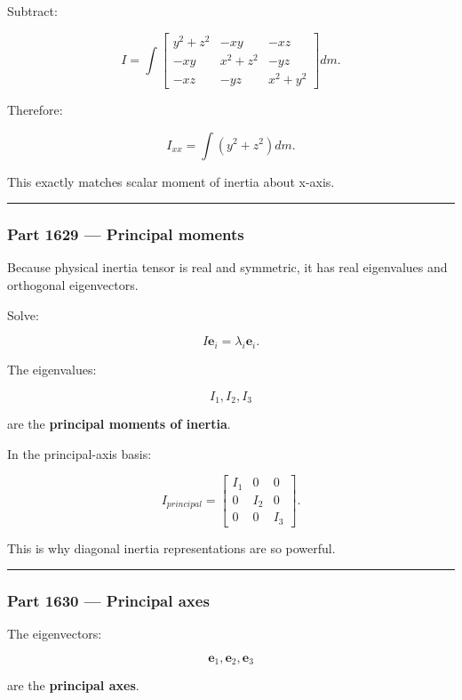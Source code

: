 Subtract:

\[
I=
\int
\begin{bmatrix}
y^2+z^2&-xy&-xz\\
-xy&x^2+z^2&-yz\\
-xz&-yz&x^2+y^2
\end{bmatrix}
dm.
\]

Therefore:

\[
I_{xx}
=
\int(y^2+z^2)dm.
\]

This exactly matches scalar moment of inertia about x-axis.

\begin{center}\rule{0.5\linewidth}{0.5pt}\end{center}

\subsubsection{Part 1629 --- Principal moments}\label{part-1629-principal-moments}

Because physical inertia tensor is real and symmetric, it has real eigenvalues and orthogonal eigenvectors.

Solve:

\[
I\mathbf{e}_i
=
\lambda_i\mathbf{e}_i.
\]

The eigenvalues:

\[
\boxed{
I_1,I_2,I_3
}
\]

are the \textbf{principal moments of inertia}.

In the principal-axis basis:

\[
I_{principal}
=
\begin{bmatrix}
I_1&0&0\\
0&I_2&0\\
0&0&I_3
\end{bmatrix}.
\]

This is why diagonal inertia representations are so powerful.

\begin{center}\rule{0.5\linewidth}{0.5pt}\end{center}

\subsubsection{Part 1630 --- Principal axes}\label{part-1630-principal-axes}

The eigenvectors:

\[
\mathbf{e}_1,\mathbf{e}_2,\mathbf{e}_3
\]

are the \textbf{principal axes}.

